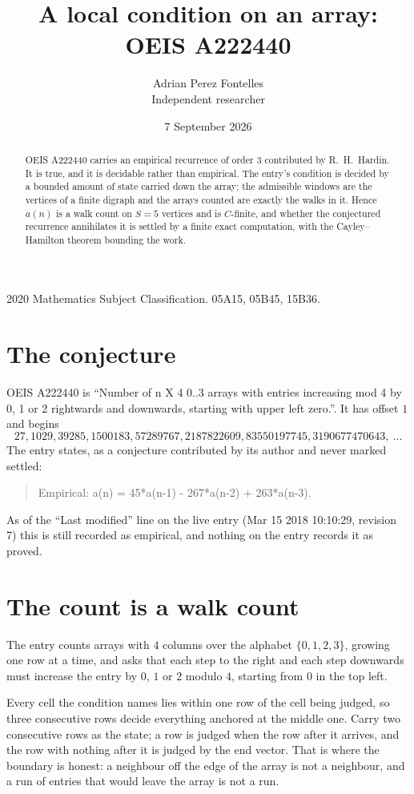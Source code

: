 \documentclass[11pt,a4paper]{article}
\title{A local condition on an array: OEIS A222440}
\author{Adrian Perez Fontelles\\ \small Independent researcher}
\date{7 September 2026}
\theoremstyle{plain}
\theoremstyle{definition}
\begin{document}
\maketitle

\begin{abstract}
OEIS A222440 carries an empirical recurrence of order $3$ contributed by R.~H.~Hardin. It is
true, and it is decidable rather than empirical. The entry's condition is decided by a bounded amount of state carried down the array; the
admissible windows are the vertices of a finite digraph and the arrays counted are exactly the
walks in it. Hence $a(n)$ is a walk count on $S=5$ vertices and is $C$-finite, and whether the
conjectured recurrence annihilates it is settled by a finite exact computation, with the
Cayley--Hamilton theorem bounding the work.
\end{abstract}

\noindent\small 2020 Mathematics Subject Classification. 05A15, 05B45, 15B36.\normalsize

\section{The conjecture}

OEIS A222440 is ``Number of n X 4 0..3 arrays with entries increasing mod 4 by 0, 1 or 2 rightwards and downwards, starting with upper left zero.''. It has offset $1$ and begins
\[
27, 1029, 39285, 1500183, 57289767, 2187822609, 83550197745, 3190677470643,\ \dots
\]
The entry states, as a conjecture contributed by its author and never marked settled:
\begin{quote}
Empirical: a(n) = 45*a(n-1) - 267*a(n-2) + 263*a(n-3).
\end{quote}
As of the ``Last modified'' line on the live entry (Mar 15 2018 10:10:29, revision 7) this is still
recorded as empirical, and nothing on the entry records it as proved.

\section{The count is a walk count}

The entry counts arrays with $4$ columns over the alphabet $\{0,1,2,3\}$, growing one row at a time, and asks that each step to the right and each step downwards must increase the entry by $0$, $1$ or $2$ modulo $4$, starting from $0$ in the top left.

Every cell the condition names lies within one row of the cell being judged, so three consecutive rows decide everything anchored at the middle one. Carry two consecutive rows as the state; a row is judged when the row after it arrives, and the row with nothing after it is judged by the end vector. That is where the boundary is honest: a neighbour off the edge of the array is not a neighbour, and a run of entries that would leave the array is not a run.
\end{document}
